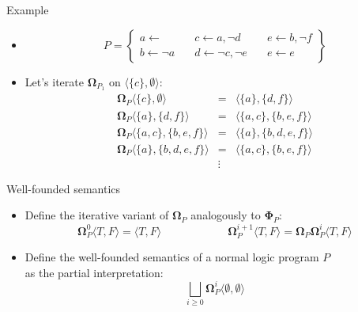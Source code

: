 \begin{frame}{Example}
  \begin{itemize}
  \item<1-> []
    \[
    P
    =
    \left\{
      \begin{array}{lll}
        a \leftarrow                  \quad &
        c \leftarrow a, \neg d       \quad &
        e \leftarrow b, \neg f
        \\
        b \leftarrow \neg a          \quad &
        d \leftarrow \neg c, \neg e \quad &
        e \leftarrow e
      \end{array}
    \right\}
    \]
    \medskip
  \item<2-> Let's iterate ${\mathbf{\Omega}}_{P_1}$ on $\langle \{c\}, \emptyset\rangle$:
    \[
    \begin{array}{rcl}
      {\mathbf{\Omega}}_{P}\langle\{c\}  ,\emptyset\rangle &=&\langle\{a\}  ,\{d,f\}     \rangle
      \\
      {\mathbf{\Omega}}_{P}\langle\{a\}  ,\{d,f\}    \rangle &=&\langle\{a,c\},\{b,e,f\}   \rangle
      \\
      {\mathbf{\Omega}}_{P}\langle\{a,c\},\{b,e,f\}  \rangle &=&\langle\{a\}  ,\{b,d,e,f\} \rangle
      \\
      {\mathbf{\Omega}}_{P}\langle\{a\}  ,\{b,d,e,f\}\rangle &=&\langle\{a,c\},\{b,e,f\}   \rangle
      \\
      & \vdots &
    \end{array}
    \]
  \end{itemize}
\end{frame}
\begin{frame}{Well-founded semantics}
  \bigskip
  \begin{itemize}
  \item<1-> Define the iterative variant of ${\mathbf{\Omega}}_P$ analogously to $\mathbf{\Phi}_P$:
    \[
    {\mathbf{\Omega}}_P^0\langle T, F \rangle = \langle T, F \rangle
    \qquad\qquad\qquad
    {\mathbf{\Omega}}_P^{i+1}\langle T, F \rangle =
    {\mathbf{\Omega}}_P{\mathbf{\Omega}}_P^i\langle T, F \rangle
    \]
  \item<2-> Define the \alert{well-founded semantics} of a normal logic program $P$\\
    as the partial interpretation:
    \[
    \textstyle{\bigsqcup_{i \geq 0}} {\mathbf{\Omega}}_P^i \langle \emptyset, \emptyset \rangle
    \]
  \end{itemize}
\end{frame}
